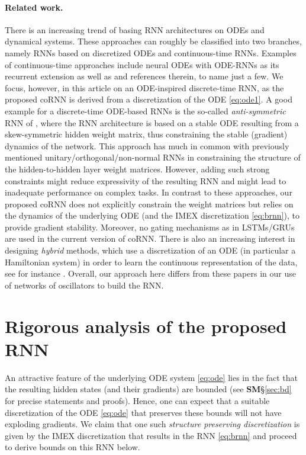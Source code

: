 \documentclass{article} \usepackage{iclr2021_conference,times}
\begin{document}
\paragraph{Related work.} There is an increasing trend of basing RNN architectures on ODEs and dynamical systems. These approaches can roughly be classified into two branches, namely RNNs based on discretized ODEs and continuous-time RNNs. Examples of continuous-time approaches include neural ODEs \citep{neuralODE} with ODE-RNNs \citep{ode_rnn} as its recurrent extension as well as \cite{E} and references therein, to name just a few.
We focus, however, in this article on an ODE-inspired discrete-time RNN, as the proposed coRNN is derived from a discretization of the ODE \eqref{eq:ode1}. A good example for a discrete-time ODE-based RNNs is the so-called \emph{anti-symmetric} RNN of \cite{anti}, where the RNN architecture is based on a stable ODE resulting from a skew-symmetric hidden weight matrix, thus constraining the stable (gradient) dynamics of the network. This approach has much in common with previously mentioned unitary/orthogonal/non-normal RNNs in constraining the structure of the hidden-to-hidden layer weight matrices. However, adding such strong constraints might reduce expressivity of the resulting RNN and might lead to inadequate performance on complex tasks. In contrast to these approaches, our proposed coRNN does not explicitly constrain the weight matrices but relies on the dynamics of the underlying ODE (and the IMEX discretization \eqref{eq:brnn}), to provide gradient stability. Moreover, no gating mechanisms as in LSTMs/GRUs are used in the current version of coRNN. There is also an increasing interest in designing \emph{hybrid} methods, which use a discretization of an ODE (in particular a Hamiltonian system) in order to learn the continuous representation of the data, see for instance \cite{hnn,srnn}. Overall, our approach here differs from these papers in our use of networks of oscillators to build the RNN.

\section{Rigorous analysis of the proposed RNN}
An attractive feature of the underlying ODE system \eqref{eq:ode} lies in the fact that the resulting hidden states (and their gradients) are bounded (see 
{\bf SM}\S\ref{sec:bd} for precise statements and proofs). Hence, one can expect that a suitable discretization of the ODE \eqref{eq:ode} that preserves these bounds will not have exploding gradients. We claim that one such \emph{structure preserving discretization} is given by the IMEX discretization that results in the RNN \eqref{eq:brnn} and proceed to derive bounds on this RNN below. 
\end{document}
